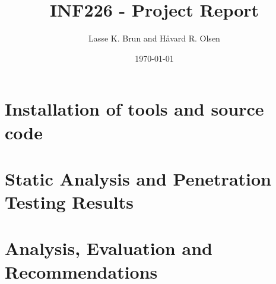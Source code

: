 \documentclass[11pt,english,a4paper]{report}
\title{INF226 - Project Report}
\date{\today}
\author{Lasse K. Brun and Håvard R. Olsen}
\begin{document}
\maketitle

\chapter{Installation of tools and source code}

\chapter{Static Analysis and Penetration Testing Results}

\chapter{Analysis, Evaluation and Recommendations}
\end{document}
